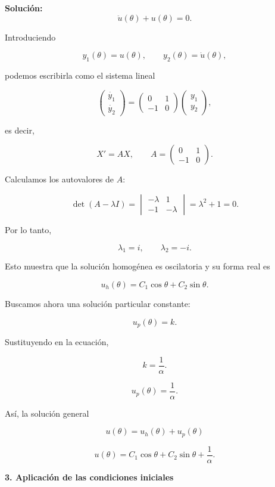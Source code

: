 \documentclass[10pt,a4paper]{article}
\newenvironment{solution}{\par\noindent\textbf{Solución: } }{}
\begin{document}
\begin{solution}
\[
\ddot{u}(\theta)+u(\theta)=0.
\]

Introduciendo

\[
y_1(\theta)=u(\theta),
\qquad
y_2(\theta)=\dot{u}(\theta),
\]

podemos escribirla como el sistema lineal

\[
\begin{pmatrix}
\dot{y_1} \\
\dot{y_2}
\end{pmatrix}
=
\begin{pmatrix}
0 & 1 \\
-1 & 0
\end{pmatrix}
\begin{pmatrix}
y_1 \\
y_2
\end{pmatrix},
\]

es decir,

\[
X'=AX,
\qquad
A=
\begin{pmatrix}
0 & 1 \\
-1 & 0
\end{pmatrix}.
\]

Calculamos los autovalores de $A$:

\[
\det(A-\lambda I)
=
\begin{vmatrix}
-\lambda & 1 \\
-1 & -\lambda
\end{vmatrix}
=
\lambda^2+1=0.
\]

Por lo tanto,

\[
\lambda_1=i,
\qquad
\lambda_2=-i.
\]

Esto muestra que la solución homogénea es oscilatoria y su forma real es

\[
\boxed{
u_h(\theta)
=
C_1\cos\theta
+
C_2\sin\theta.
}
\]

Buscamos ahora una solución particular constante:

\[
u_p(\theta)=k.
\]

Sustituyendo en la ecuación,

\[
k=\frac{1}{\alpha}.
\]

\[
\boxed{u_p(\theta)=\frac{1}{\alpha}}.
\]

Así, la solución general 

\[
u(\theta) = u_h(\theta) + u_p(\theta)
\]

\[
\boxed{
u(\theta)
=
C_1\cos\theta
+
C_2\sin\theta
+
\frac{1}{\alpha}.
}
\]

\vspace{0.4cm}

\noindent
\textbf{\large 3. Aplicación de las condiciones iniciales}


\end{solution}
\end{document}
